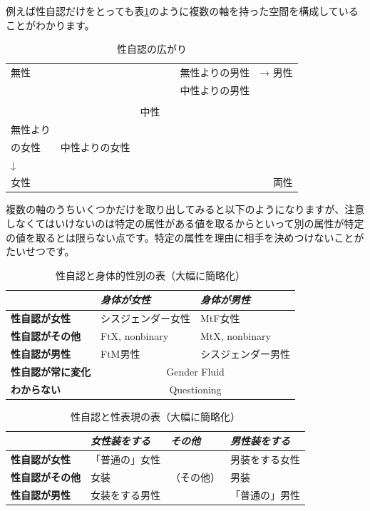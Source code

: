\documentclass[9pt,a3paper,oneside,twocolumn]{ltjsarticle}
\begin{document}
例えば性自認だけをとっても表\ref{table:genderidentity}のように複数の軸を持った空間を構成していることがわかります。

\begin{table}[h]
\begin{tabular}{|llcrr}
\hline
無性 & & &　無性よりの男性 & → 男性 \\
& & & 中性よりの男性 & \\
& & & & \\
& & 中性 & & \\
無性より & & & & \\
の女性 & 中性よりの女性 & & & \\
↓ & & & & \\
女性 & & & & 両性 \\
\end{tabular}
\caption{性自認の広がり}
\label{table:genderidentity}
\end{table}

複数の軸のうちいくつかだけを取り出してみると以下のようになりますが、注意しなくてはいけないのは特定の属性がある値を取るからといって別の属性が特定の値を取るとは限らない点です。特定の属性を理由に相手を決めつけないことがたいせつです。

\begin{table}[h]
\centering
\begin{tabular}{l|ll}
& \emph{身体が女性} & \emph{身体が男性} \\
\hline\hline
\textbf{性自認が女性} & シスジェンダー女性 & MtF女性 \\
\hline
\textbf{性自認がその他} & FtX, nonbinary & MtX, nonbinary \\
\hline
\textbf{性自認が男性} & FtM男性 & シスジェンダー男性 \\
\hline
\textbf{性自認が常に変化} & \multicolumn{2}{c}{Gender Fluid} \\
\hline
\textbf{わからない} & \multicolumn{2}{c}{Questioning} \\
\hline
\end{tabular}
\caption{性自認と身体的性別\footnotemark[1]の表（大幅に簡略化）}
\label{table:genderidentity_sex}
\end{table}

\begin{table}[h]
\centering
\begin{tabular}{l||l|l|l}
& \emph{女性装をする} & \emph{その他} & \emph{男性装をする} \\
\hline\hline
\textbf{性自認が女性} & 「普通の」女性 & \multirow{3}{*}{（その他）} & 男装をする女性 \\
\cline{1-2}\cline{4-4}
\textbf{性自認がその他} & 女装 & & 男装 \\
\cline{1-2}\cline{4-4}
\textbf{性自認が男性} & 女装をする男性 & & 「普通の」男性 \\
\hline
\end{tabular}
\caption{性自認と性表現の表（大幅に簡略化）}
\label{table:genderidentity_expression}
\end{table}
\end{document}
